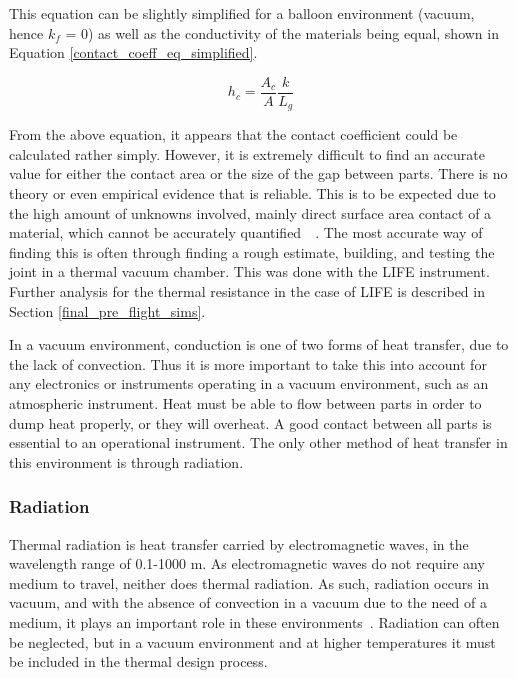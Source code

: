 This equation can be slightly simplified for a balloon environment (vacuum, hence $k_f$ = 0) as well as the conductivity of the materials being equal, shown in Equation \ref{contact_coeff_eq_simplified}.

\begin{equation}\label{contact_coeff_eq_simplified}
    h_c = \frac{A_c}{A}\frac{k}{L_g}
\end{equation}

From the above equation, it appears that the contact coefficient could be calculated rather simply. However, it is extremely difficult to find an accurate value for either the contact area or the size of the gap between parts. There is no theory or even empirical evidence that is reliable. This is to be expected due to the high amount of unknowns involved, mainly direct surface area contact of a material, which cannot be accurately quantified~\citep{Heat_Transfer_Resistance}~\citep{stephane_thermal_contact}. The most accurate way of finding this is often through finding a rough estimate, building, and testing the joint in a thermal vacuum chamber. This was done with the LIFE instrument. Further analysis for the thermal resistance in the case of LIFE is described in Section \ref{final_pre_flight_sims}.

In a vacuum environment, conduction is one of two forms of heat transfer, due to the lack of convection. Thus it is more important to take this into account for any electronics or instruments operating in a vacuum environment, such as an atmospheric instrument. Heat must be able to flow between parts in order to dump heat properly, or they will overheat. A good contact between all parts is essential to an operational instrument. The only other method of heat transfer in this environment is through radiation. 

\subsubsection{Radiation}\label{radiation_sec}
Thermal radiation is heat transfer carried by electromagnetic waves, in the wavelength range of 0.1-1000 \textmu m. As electromagnetic waves do not require any medium to travel, neither does thermal radiation. As such, radiation occurs in vacuum, and with the absence of convection in a vacuum due to the need of a medium, it plays an important role in these environments~\citep{Heat_Transfer_Basics}. Radiation can often be neglected, but in a vacuum environment and at higher temperatures it must be included in the thermal design process.

